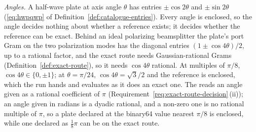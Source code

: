 \begin{remark}
\emph{Angles.} A half-wave plate at axis angle $\theta$ has entries
$\pm\cos2\theta$ and $\pm\sin2\theta$
(\eqref{eq:hwpqwp} of Definition~\ref{def:catalogue-entries}). Every angle
is enclosed, so the angle decides nothing about whether a reference exists;
it decides whether the reference can be exact. Behind an ideal polarizing
beamsplitter the plate's port Gram on the two polarization modes has the
diagonal entries $(1\pm\cos4\theta)/2$, up to a rational factor, and the exact
route needs Gaussian-rational Grams (Definition~\ref{def:exact-route}), so it
needs $\cos4\theta$ rational. At multiples of $\pi/8$,
$\cos4\theta\in\{0,\pm1\}$; at $\theta=\pi/24$, $\cos4\theta=\sqrt3/2$ and
the reference is enclosed, which the run hands and evaluates as it does an
exact one. The  reads an angle given as a rational
coefficient of $\pi$ (Requirement~\ref{req:exact-route-decision}\,(ii)); an
angle given in radians is a dyadic rational, and a non-zero one is no
rational multiple of $\pi$, so a plate declared at the binary64 value nearest
$\pi/8$ is enclosed, while one declared as $\tfrac18\pi$ can be on the
exact route.
\end{remark}
